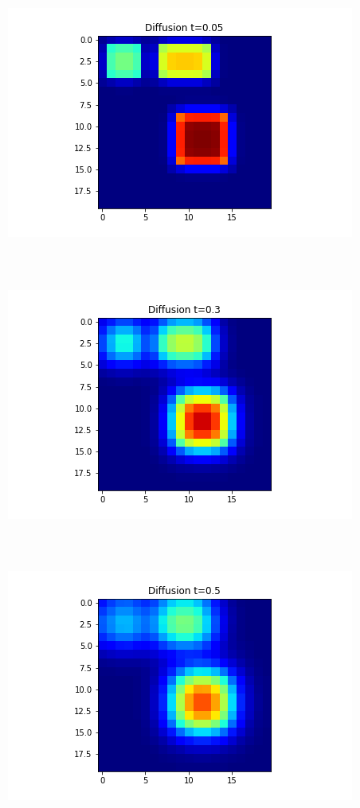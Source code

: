 \documentclass[10pt,a4paper]{article}
\theoremstyle{plain}
\theoremstyle{definition}
\begin{document}
\begin{figure}[!h]
\begin{subfigure}[b]{0.25\textwidth}
    		\includegraphics[width= \textwidth]{images/laplace-x3-t05.png}
    		\caption{}
    		\label{laplacet05}
    	\end{subfigure}~
    	\begin{subfigure}[b]{0.25\textwidth}
    		\includegraphics[width= \textwidth]{images/laplace-x3-t3.png}
    		\caption{}
    		\label{laplacet3}
    	\end{subfigure}~
    	\begin{subfigure}[b]{0.25\textwidth}
    		\includegraphics[width= \textwidth]{images/laplace-x3-t5.png}

\end{subfigure}
\end{figure}
\end{document}

